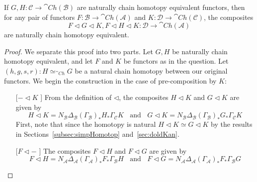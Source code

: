 \begin{lem}[label=lem:3.4NewComp]
    If $G,H:\mathcal{C}\rightarrow \cat{Ch}(\mathcal{B})$ are naturally chain homotopy equivalent functors, then for any pair of functors $F:\mathcal{B}\rightarrow \cat{Ch}(\mathcal{A})$ and $K:\mathcal{D}\rightarrow \cat{Ch}(\mathcal{C})$, the composites
    \begin{equation*}
        F\lhd G\lhd K,F\lhd H\lhd K:\mathcal{D}\rightarrow \cat{Ch}(\mathcal{A})
    \end{equation*}
    are naturally chain homotopy equivalent.
\end{lem}
\begin{proof}
    We separate this proof into two parts. Let $G,H$ be naturally chain homotopy equivalent, and let $F$ and $K$ be functors as in the question. Let $(h,g,s,r):H\simeq_{\cat{Ch}}G$ be a natural chain homotopy between our original functors. We begin the construction in the case of pre-composition by $K$:
    \begin{itemize}
        \setlength{\itemindent}{2em}
        \item[[$-\lhd K$]] From the definition of $\lhd$, the composites $H\lhd K$ and $G\lhd K$ are given by
        \begin{equation*}
            H\lhd K = N_\mathcal{B}\Delta_\mathcal{B}(\Gamma_\mathcal{B})_*H_*\Gamma_\mathcal{C}K\;\;\text{ and }\;\;G\lhd K = N_\mathcal{B}\Delta_\mathcal{B}(\Gamma_\mathcal{B})_*G_*\Gamma_\mathcal{C}K
        \end{equation*}
        First, note that since the homotopy is natural $H\lhd K\simeq G\lhd K$ by the results in Sections~\ref{subsec:simpHomotop} and~\ref{sec:doldKan}. 
        \item[[$F\lhd -$]] The composites $F \lhd H$ and $F\lhd G$ are given by
        \begin{equation*}
            F\lhd H = N_\mathcal{A}\Delta_\mathcal{A}(\Gamma_\mathcal{A})_*F_*\Gamma_\mathcal{B}H\;\;\text{ and }\;\;F\lhd G = N_\mathcal{A}\Delta_\mathcal{A}(\Gamma_\mathcal{A})_*F_*\Gamma_\mathcal{B}G

\end{equation*}
\end{itemize}
\end{proof}
